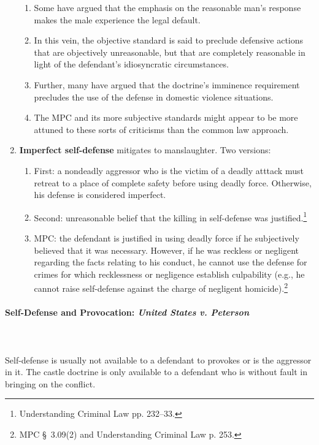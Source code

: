 \begin{enumerate}
\begin{enumerate}
        \item Some have argued that the emphasis on the reasonable man's 
        response makes the male experience the legal default.
        \item In this vein, the objective standard is said to preclude 
        defensive actions that are objectively unreasonable, but that are 
        completely reasonable in light of the defendant's idiosyncratic 
        circumstances.
        \item Further, many have argued that the doctrine's imminence 
        requirement precludes the use of the defense in domestic violence 
        situations.
        \item The MPC and its more subjective standards might appear to be 
        more attuned to these sorts of criticisms than the common law 
        approach. 
    \end{enumerate}
    \item \textbf{Imperfect self-defense} mitigates to manslaughter. Two versions:
    \begin{enumerate}
        \item First: a nondeadly aggressor who is the victim of a deadly 
        atttack must retreat to a place of complete safety before using deadly 
        force. Otherwise, his defense is considered imperfect.
        \item Second: unreasonable belief that the killing in self-defense was 
        justified.\footnote{Understanding Criminal Law pp. 232--33.}
        \item MPC: the defendant is justified in using deadly force if he 
        subjectively believed that it was necessary. However, if he was 
        reckless or negligent regarding the facts relating to his conduct, he 
        cannot use the defense for crimes for which recklessness or negligence 
        establish culpability (e.g., he cannot raise self-defense against the 
        charge of negligent homicide).\footnote{MPC \S\ 3.09(2) and 
        Understanding Criminal Law p. 253.}
    \end{enumerate}
\end{enumerate}

\paragraph{Self-Defense and Provocation: \emph{United States v. Peterson}}
~\\\\
Self-defense is usually not available to a defendant to provokes or is the 
aggressor in it. The castle doctrine is only available to a defendant who is 
without fault in bringing on the conflict.

